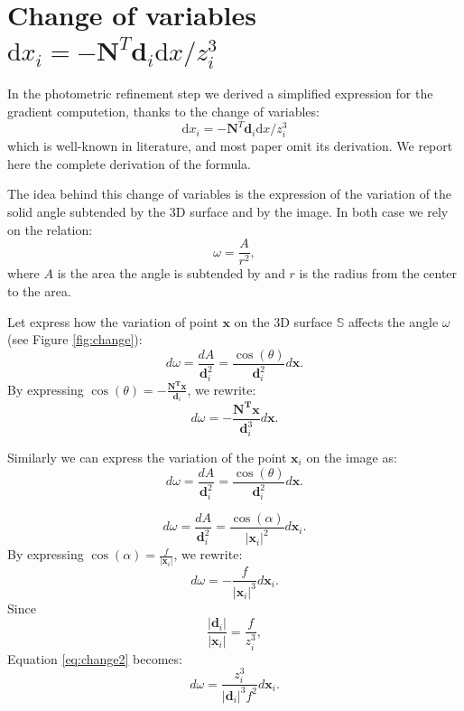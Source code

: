  

\chapter[Change of variables \texorpdfstring{\normalfont  $\textrm{d}x_i = -\mathbf{N}^T \mathbf{d}_i \textrm{d}x/z_i^3$}{}]{Change of variables \\ \texorpdfstring{\normalfont $\textrm{d}x_i = -\mathbf{N}^T \mathbf{d}_i \textrm{d}x/z_i^3$}{}}
\label{app:change}

In the photometric refinement step we derived a simplified expression for the gradient computetion, thanks to the change of variables:
\begin{equation}
 \textrm{d}x_i = -\mathbf{N}^T \mathbf{d}_i \textrm{d}x/z_i^3
\end{equation}
which is well-known in literature, and most paper omit its derivation.
We report here the complete derivation of the formula.

The idea behind this change of variables is the expression of the variation of the solid angle subtended by the 3D surface and by the image. 
In both case we rely on the relation:
\begin{equation}
    \omega = \frac{A}{r^2},
\end{equation}
where $A$ is the area the angle is subtended by and $r$ is the radius from the center to the area.


Let express how the variation of point $\mathbf{x}$ on the 3D surface $\mathbb{S}$ affects the angle $\omega$ (see Figure \ref{fig:change}):
\begin{equation}
    d\omega = \frac{dA}{\mathbf{d}_i^2} = \frac{\cos(\theta)}{\mathbf{d}_i^2}d\mathbf{x}.
\end{equation}
By expressing $\cos(\theta) = -\frac{\mathbf{N^T x}}{\mathbf{d}_i}$,  we rewrite:
\begin{equation}
\label{eq:change1}
    d\omega  = -\frac{\mathbf{N^T x}}{\mathbf{d}_i^3}d\mathbf{x}.
\end{equation}

Similarly we can express the variation of the point $\mathbf{x}_i$ on the image as: 
\begin{equation}
    d\omega = \frac{dA}{\mathbf{d}_i^2} = \frac{\cos(\theta)}{\mathbf{d}_i^2}d\mathbf{x}.
\end{equation}

\begin{equation}
\label{eq:change2}
    d\omega = \frac{dA}{\mathbf{d}_i^2} = \frac{\cos(\alpha)}{|\mathbf{x}_i|^2}d\mathbf{x}_i.
\end{equation}
By expressing $\cos(\alpha) = \frac{f}{|\mathbf{x}_i|}$,  we rewrite:
\begin{equation}
    d\omega  = -\frac{f}{|\mathbf{x}_i|^3}d\mathbf{x}_i.
\end{equation}
Since
\begin{equation}
 \frac{|\mathbf{d}_i|}{|\mathbf{x}_i|} = \frac{f}{z_i^3},
\end{equation}
Equation \eqref{eq:change2} becomes:
\begin{equation}
\label{eq:change3}
    d\omega  = \frac{z_i^3}{|\mathbf{d}_i|^3 f^2}d\mathbf{x}_i.
\end{equation}

